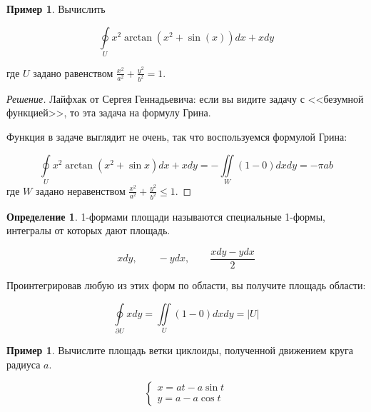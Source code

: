 \documentclass[a5paper]{article}
\newcounter{through}
\theoremstyle{plain}
\theoremstyle{definition}
\newtheorem{definition}[through]{Определение}
\newtheorem{example}[through]{Пример}
\numberwithin{through}{section}
\numberwithin{equation}{section}
\begin{document}
\begin{example}
	Вычислить
	
	\begin{equation*}
		\oint\limits_{U} x^2 \arctan(x^2+\sin(x))dx + xdy
	\end{equation*}
	
	где $U$ задано равенством $\frac{x^2}{a^2} + \frac{y^2}{b^2} = 1$.
\end{example}

\begin{proof}[Решение]
	Лайфхак от Сергея Геннадьевича: если вы видите задачу с <<безумной функцией>>, то эта задача на формулу Грина.
	
	Функция в задаче выглядит не очень, так что воспользуемся формулой Грина:
	
	\begin{equation*}
	\oint\limits_{U} x^2 \arctan(x^2+\sin x)dx + xdy = -\iint\limits_{W} (1 - 0) dxdy = -\pi ab
	\end{equation*}
	где $W$ задано неравенством $\frac{x^2}{a^2} + \frac{y^2}{b^2} \leq 1$.
\end{proof}

\begin{definition}
	1-формами площади называются специальные 1-формы, интегралы от которых дают площадь.
	
	\[
		xdy, \quad \quad -ydx, \quad \quad \frac{xdy-ydx}{2}
	\]
\end{definition}

Проинтегрировав любую из этих форм по области, вы получите площадь области:

\begin{equation*}
	\oint\limits_{\partial U}xdy = \iint\limits_{U} (1 - 0)dxdy = |U|
\end{equation*}

\begin{example}
	Вычислите площадь ветки циклоиды, полученной движением круга радиуса $a$.
	
	\begin{equation*}
		\begin{cases}
			x = at-a\sin t \\
			y = a - a\cos t
		\end{cases}
	\end{equation*}
\end{example}
\end{document}
